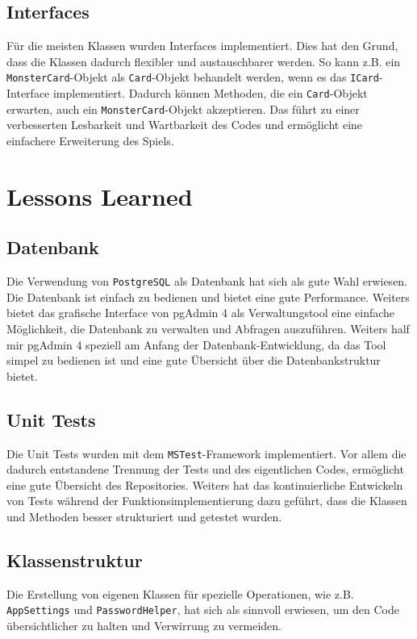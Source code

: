 \documentclass[a4paper, 12pt]{article}
\begin{document}
\subsection{Interfaces}
Für die meisten Klassen wurden Interfaces implementiert. Dies hat den Grund, dass die Klassen dadurch flexibler und austauschbarer werden. 
So kann z.B. ein \texttt{MonsterCard}-Objekt als \texttt{Card}-Objekt behandelt werden, wenn es das \texttt{ICard}-Interface implementiert. 
Dadurch können Methoden, die ein \texttt{Card}-Objekt erwarten, auch ein \texttt{MonsterCard}-Objekt akzeptieren.
Das führt zu einer verbesserten Lesbarkeit und Wartbarkeit des Codes und ermöglicht eine einfachere Erweiterung des Spiels.

\section{Lessons Learned}
\subsection{Datenbank}
Die Verwendung von \texttt{PostgreSQL} als Datenbank hat sich als gute Wahl erwiesen. Die Datenbank ist einfach zu bedienen und bietet eine gute Performance.
Weiters bietet das grafische Interface von pgAdmin 4 als Verwaltungstool eine einfache Möglichkeit, die Datenbank zu verwalten und Abfragen auszuführen.
Weiters half mir pgAdmin 4 speziell am Anfang der Datenbank-Entwicklung, da das Tool simpel zu bedienen ist und eine gute Übersicht über die Datenbankstruktur bietet.

\subsection{Unit Tests}
Die Unit Tests wurden mit dem \texttt{MSTest}-Framework implementiert. Vor allem die dadurch entstandene Trennung der Tests und des eigentlichen Codes, ermöglicht eine gute Übersicht des Repositories.
Weiters hat das kontinuierliche Entwickeln von Tests während der Funktionsimplementierung dazu geführt, dass die Klassen und Methoden besser strukturiert und getestet wurden.


\subsection{Klassenstruktur}
Die Erstellung von eigenen Klassen für spezielle Operationen, wie z.B. \texttt{AppSettings} und \texttt{PasswordHelper}, hat sich als sinnvoll erwiesen, um den Code übersichtlicher zu halten und Verwirrung zu vermeiden.
\end{document}
